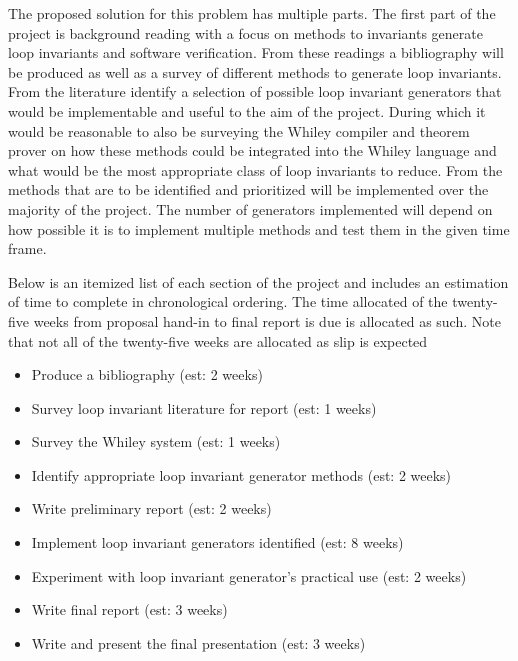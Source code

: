 \documentclass[11pt, a4paper, twoside, openright]{report}
\begin{document}
The proposed solution for this problem has multiple parts.
The first part of the project is background reading with a focus on
methods to invariants generate loop invariants and software
verification. From these readings a bibliography will be produced
as well as a survey of different methods to generate loop invariants.
From the literature identify a selection of possible loop invariant
generators that would be implementable and useful to the aim of the project.
During which it would be reasonable to also be surveying the Whiley
compiler and theorem prover on how these methods could be integrated into the Whiley language
and what would be the most appropriate class of loop invariants to reduce.
From the methods that are to be identified and prioritized 
will be implemented over the majority of the project.
The number of generators implemented will depend on how possible
it is to implement multiple methods and test them in the given time frame.

Below is an itemized list of each section of the project and includes an
estimation of time to complete in chronological ordering.
The time allocated of the twenty-five weeks from proposal hand-in to
final report is due is allocated as such. Note that not all of the
twenty-five weeks are allocated as slip is expected

\begin{itemize}
    \item Produce a bibliography (est: 2 weeks) 
    \item Survey loop invariant literature for report (est: 1 weeks) 
    \item Survey the Whiley system (est: 1 weeks)
    \item Identify appropriate loop invariant generator methods (est: 2 weeks)
    \item Write preliminary report (est: 2 weeks)
    \item Implement loop invariant generators identified (est: 8 weeks)
    \item Experiment with loop invariant generator's practical use (est: 2 weeks)
    \item Write final report (est: 3 weeks)
    \item Write and present the final presentation (est: 3 weeks)
\end{itemize}
\end{document}

